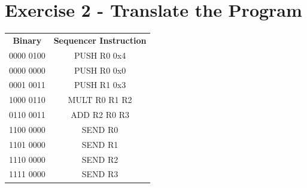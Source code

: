 \documentclass{article}
\begin{document}
 

\section*{Exercise 2 - Translate the Program}

\begin{center}
\begin{tabular}{ c c}

 \textbf{Binary} & \textbf{Sequencer Instruction} \\ 
 0000 0100 & PUSH R0 0x4 \\  
 0000 0000 & PUSH R0 0x0 \\
0001 0011 & PUSH R1 0x3 \\
1000 0110 & MULT R0 R1 R2 \\
0110 0011 & ADD R2 R0 R3 \\
1100 0000 & SEND R0 \\
1101 0000 & SEND R1 \\
1110 0000 & SEND R2 \\
1111 0000 & SEND R3 \\
 
\end{tabular}
\end{center}





%

%

\end{document}
